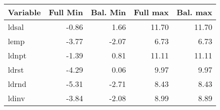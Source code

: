 \begin{tabular}{lrrrr}
  \hline
Variable & Full Min & Bal. Min & Full max & Bal. max \\ 
  \hline
ldsal & -0.86 & 1.66 & 11.70 & 11.70 \\ 
  lemp & -3.77 & -2.07 & 6.73 & 6.73 \\ 
  ldnpt & -1.39 & 0.81 & 11.11 & 11.11 \\ 
  ldrst & -4.29 & 0.06 & 9.97 & 9.97 \\ 
  ldrnd & -5.31 & -2.71 & 8.43 & 8.43 \\ 
  ldinv & -3.84 & -2.08 & 8.99 & 8.89 \\ 
   \hline
\end{tabular}
